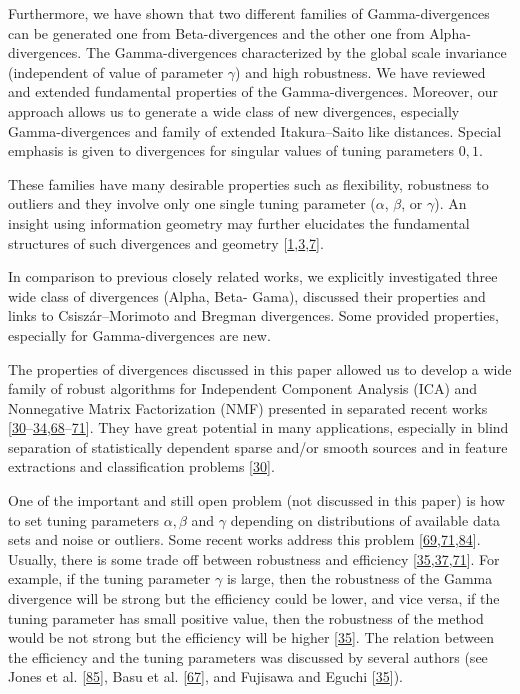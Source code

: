 Furthermore, we have shown that two different families of Gamma-divergences can be generated one from Beta-divergences and the other one from Alpha-divergences. The Gamma-divergences characterized by the global scale invariance (independent of value of parameter \(\gamma\)) and high robustness. We have reviewed and extended fundamental properties of the Gamma-divergences. Moreover, our approach allows us to generate a wide class of new divergences, especially Gamma-divergences and family of extended Itakura–Saito like distances. Special emphasis is given to divergences for singular values of tuning parameters \(0,1\).


These families have many desirable properties such as flexibility, robustness to outliers and they involve only one single tuning parameter (\(\alpha\), \(\beta\), or \(\gamma\)). An insight using information geometry may further elucidates the fundamental structures of such divergences and geometry [\hyperlink{B1-entropy-12-01532}{1},\allowbreak \hyperlink{B3-entropy-12-01532}{3},\allowbreak \hyperlink{B7-entropy-12-01532}{7}].


In comparison to previous closely related works, we explicitly investigated three wide class of divergences (Alpha, Beta- Gama), discussed their properties and links to Csiszár–Morimoto and Bregman divergences. Some provided properties, especially for Gamma-divergences are new.


The properties of divergences discussed in this paper allowed us to develop a wide family of robust algorithms for Independent Component Analysis (ICA) and Nonnegative Matrix Factorization (NMF) presented in separated recent works [\hyperlink{B30-entropy-12-01532}{30}--\hyperlink{B34-entropy-12-01532}{34},\allowbreak \hyperlink{B68-entropy-12-01532}{68}--\hyperlink{B71-entropy-12-01532}{71}]. They have great potential in many applications, especially in blind separation of statistically dependent sparse and/or smooth sources and in feature extractions and classification problems [\hyperlink{B30-entropy-12-01532}{30}].


One of the important and still open problem (not discussed in this paper) is how to set tuning parameters \(\alpha,\beta\) and \(\gamma\) depending on distributions of available data sets and noise or outliers. Some recent works address this problem [\hyperlink{B69-entropy-12-01532}{69},\allowbreak \hyperlink{B71-entropy-12-01532}{71},\allowbreak \hyperlink{B84-entropy-12-01532}{84}]. Usually, there is some trade off between robustness and efficiency [\hyperlink{B35-entropy-12-01532}{35},\allowbreak \hyperlink{B37-entropy-12-01532}{37},\allowbreak \hyperlink{B71-entropy-12-01532}{71}]. For example, if the tuning parameter \(\gamma\) is large, then the robustness of the Gamma divergence will be strong but the efficiency could be lower, and vice versa, if the tuning parameter has small positive value, then the robustness of the method would be not strong but the efficiency will be higher [\hyperlink{B35-entropy-12-01532}{35}]. The relation between the efficiency and the tuning parameters was discussed by several authors (see Jones et al. [\hyperlink{B85-entropy-12-01532}{85}], Basu et al. [\hyperlink{B67-entropy-12-01532}{67}], and Fujisawa and Eguchi [\hyperlink{B35-entropy-12-01532}{35}]).
